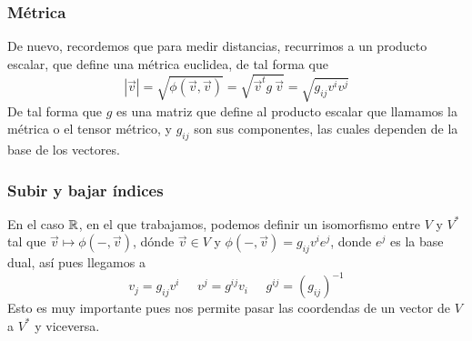 \subsubsection{Métrica}
De nuevo, recordemos que para medir distancias, recurrimos a un producto escalar, que define una métrica euclidea, de tal forma que
\[|\vec{v}|=\sqrt{\phi(\vec{v},\vec{v})}=\sqrt{\vec{v}^t g \ \vec{v}}=\sqrt{g_{ij} v^i v^j}\]
De tal forma que $g$ es una matriz que define al producto escalar que llamamos la métrica o el tensor métrico, y $g_{ij}$ son sus componentes, las cuales dependen de la base de los vectores.
\subsubsection{Subir y bajar índices}
En el caso $\mathbb{R}$, en el que trabajamos, podemos definir un isomorfismo entre $V$ y $V^*$ tal que $\vec{v}\mapsto \phi(-,\vec{v})$, dónde $\vec{v} \in V$ y $\phi(-,\vec{v})=g_{ij} v^i e^j$, donde $e^j$ es la base dual, así pues llegamos a
\[v_j = g_{ij} v^i \;\;\;\;\; v^j = g^{ij} v_i \;\;\;\;\; g^{ij} = \left(g_{ij}\right)^{-1}\]
Esto es muy importante pues nos permite pasar las coordendas de un vector de $V$ a $V^*$ y viceversa.